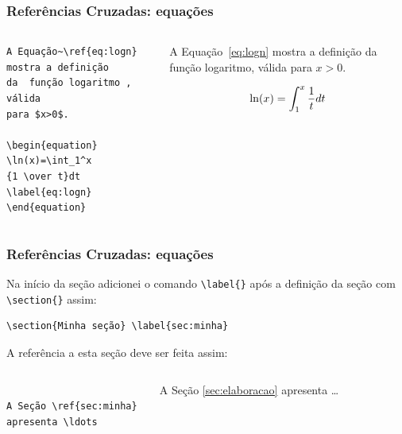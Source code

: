 \begin{frame}[fragile]
\frametitle{Referências Cruzadas: equações}
{\scriptsize
\begin{columns}
\begin{verbatim}
A Equação~\ref{eq:logn} mostra a definição
da  função logaritmo , válida
para $x>0$.

\begin{equation}
\ln(x)=\int_1^x
{1 \over t}dt
\label{eq:logn}
\end{equation}
\end{verbatim}

\begin{framed}
A Equação~\ref{eq:logn} mostra
a definição da função logaritmo,
válida para $x>0$.

\begin{equation}
\ln(x)=\int_1^x
{1 \over t}dt
\label{eq:logn}
\end{equation}
\end{framed}
\end{columns}
 }
\end{frame}

\begin{frame}[fragile]
\frametitle{Referências Cruzadas: equações}

Na início da seção adicionei o comando \verb|\label{}| após a definição da seção com
\verb|\section{}| assim:
\begin{verbatim}
\section{Minha seção} \label{sec:minha}
\end{verbatim}

A referência a esta seção deve ser feita assim:

\begin{columns}
\begin{verbatim}

A Seção \ref{sec:minha} 
apresenta \ldots

\end{verbatim}

\begin{framed}
A Seção \ref{sec:elaboracao}
apresenta \ldots
\end{framed}
\end{columns}
\end{frame}


